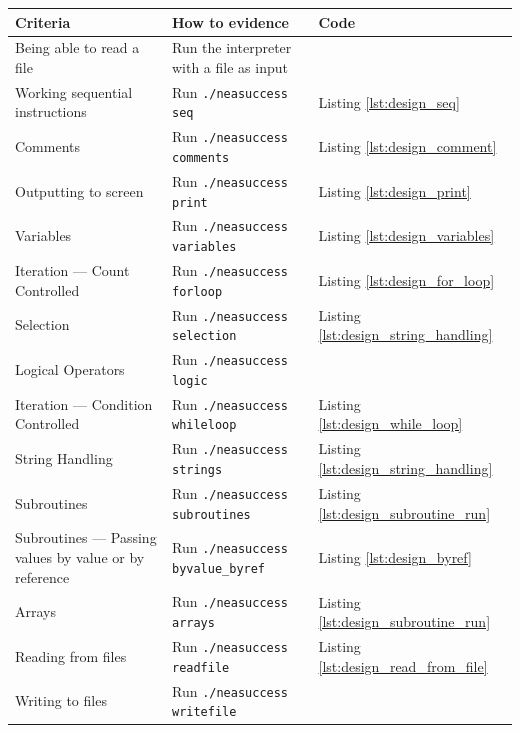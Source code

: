 \documentclass{article}
\begin{document}
\begin{table}
    \begin{adjustbox}{center}
        \begin{tabular}{|l|l|l|}
            \hline
			Criteria & How to evidence & Code \\
            \hline
            Being able to read a file & Run the interpreter with a file as input & \\
            \hline
			Working sequential instructions & Run \texttt{./neasuccess seq} & Listing \ref{lst:design_seq} \\
            \hline
			Comments & Run \texttt{./neasuccess comments} & Listing \ref{lst:design_comment} \\
            \hline
			Outputting to screen & Run \texttt{./neasuccess print} & Listing \ref{lst:design_print} \\
            \hline
			Variables & Run \texttt{./neasuccess variables} & Listing \ref{lst:design_variables} \\
            \hline
            Iteration --- Count Controlled & Run \texttt{./neasuccess forloop} & Listing \ref{lst:design_for_loop} \\
            \hline
			Selection & Run \texttt{./neasuccess selection} & Listing \ref{lst:design_string_handling} \\
            \hline
			Logical Operators & Run \texttt{./neasuccess logic} & \\
            \hline
            Iteration --- Condition Controlled & Run \texttt{./neasuccess whileloop} & Listing \ref{lst:design_while_loop} \\
            \hline
			String Handling & Run \texttt{./neasuccess strings} & Listing \ref{lst:design_string_handling} \\
            \hline
			Subroutines & Run \texttt{./neasuccess subroutines} & Listing \ref{lst:design_subroutine_run} \\
            \hline
            Subroutines --- Passing values by value or by reference & Run \texttt{./neasuccess byvalue\_byref} & Listing \ref{lst:design_byref} \\
            \hline
			Arrays & Run \texttt{./neasuccess arrays} & Listing \ref{lst:design_subroutine_run} \\
            \hline
			Reading from files & Run \texttt{./neasuccess readfile} & Listing \ref{lst:design_read_from_file} \\
            \hline
			Writing to files & Run \texttt{./neasuccess writefile} & \\

\end{tabular}
\end{adjustbox}
\end{table}
\end{document}

